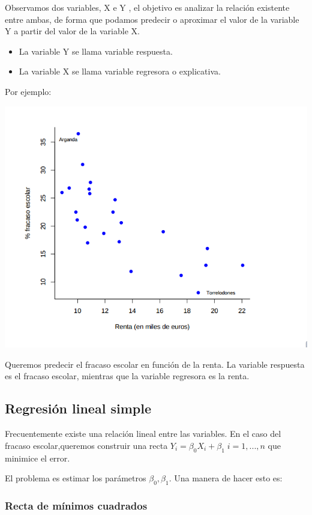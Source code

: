 \documentclass[palatino,nochap]{apuntes}
\begin{document}
Observamos dos variables, X e Y , el objetivo es analizar la relación existente entre ambas, de forma que podamos predecir o aproximar el valor de la variable Y a partir del valor de la variable X.

\begin{itemize}
\item La variable Y se llama variable respuesta.
\item La variable X se llama variable regresora o explicativa.
\end{itemize}

Por ejemplo:
\begin{center}
\includegraphics[scale=0.5]{img/RentaVsFracaso.png}
\end{center}

Queremos predecir el fracaso escolar en función de la renta. La variable respuesta es el fracaso escolar, mientras que la variable regresora es la renta.

\subsection{Regresión lineal simple}

Frecuentemente existe una relación lineal entre las variables. En el caso del fracaso escolar,queremos construir una recta $Y_i = β_0 X_i + β_1\; i=1,...,n$ que minimice el error.

El problema es estimar los parámetros $β_0,β_1$. Una manera de hacer esto es:

\subsubsection{Recta de mínimos cuadrados}
\end{document}

